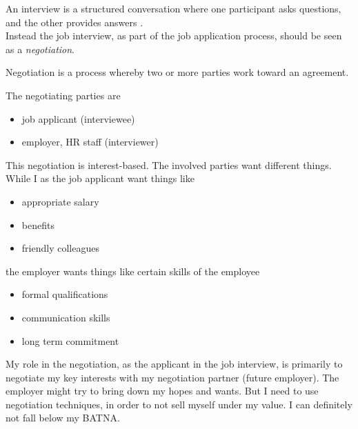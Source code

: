 \noindent An interview is a structured conversation where one participant asks questions, and the other provides answers \autocite{merriamWebsterDefinitionInterview}. \\

\noindent Instead the job interview, as part of the job application process,
should be seen as a \emph{negotiation}. \\

\begin{center}
	\noindent Negotiation is a process whereby two or
	more parties work toward an agreement.
\end{center}


\noindent The negotiating parties are

\begin{itemize}
	\item job applicant (interviewee)
	\item employer, HR staff (interviewer)
\end{itemize}


\noindent This negotiation is interest-based. The involved parties want different things.
While I as the job applicant want things like

\begin{itemize}
	\item appropriate salary
	\item benefits
	\item friendly colleagues
\end{itemize}

\noindent the employer wants things like certain skills of the employee

\begin{itemize}
	\item formal qualifications
	\item communication skills
	\item long term commitment
\end{itemize}


\noindent My role in the negotiation, as the applicant in the job interview,
is primarily to negotiate my key interests with my negotiation partner
(future employer). The employer might try to bring down my hopes and wants.
But I need to use negotiation techniques, in order to not sell myself under
my value. I can definitely not fall below my BATNA. 

